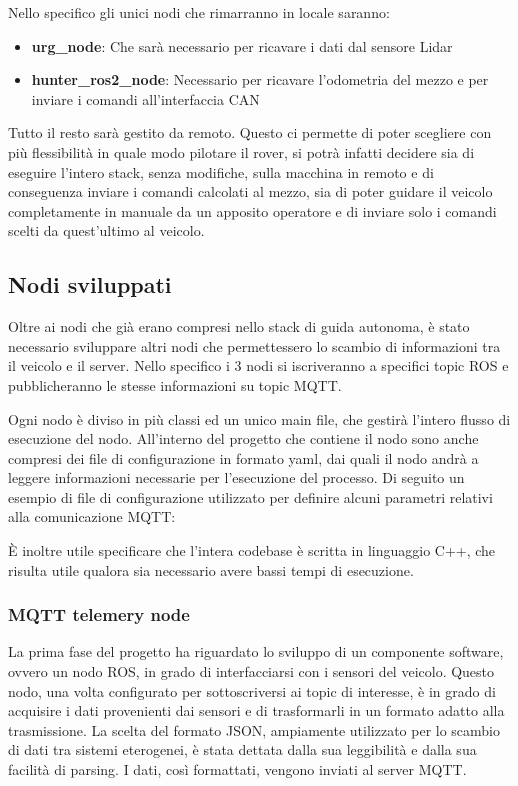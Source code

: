 \noindent Nello specifico gli unici nodi che rimarranno in locale saranno:

\begin{itemize}
  \item \textbf{urg\_node}: Che sarà necessario per ricavare i dati dal sensore Lidar
  \item \textbf{hunter\_ros2\_node}: Necessario per ricavare l'odometria del mezzo e per inviare i comandi all'interfaccia CAN
\end{itemize}

\noindent Tutto il resto sarà gestito da remoto. Questo ci permette di poter scegliere con più flessibilità in quale modo pilotare il rover, si potrà infatti decidere sia di eseguire l'intero stack, senza modifiche, sulla macchina in remoto e di conseguenza inviare i comandi calcolati al mezzo, sia di poter guidare il veicolo completamente in manuale da un apposito operatore e di inviare solo i comandi scelti da quest'ultimo al veicolo.

\subsection{Nodi sviluppati}
Oltre ai nodi che già erano compresi nello stack di guida autonoma, è stato necessario sviluppare altri nodi che permettessero lo scambio di informazioni tra il veicolo e il server. Nello specifico i 3 nodi si iscriveranno a specifici topic ROS e pubblicheranno le stesse informazioni su topic MQTT.

\noindent Ogni nodo è diviso in più classi ed un unico main file, che gestirà l'intero flusso di esecuzione del nodo. All'interno del progetto che contiene il nodo sono anche compresi dei file di configurazione in formato yaml, dai quali il nodo andrà a leggere informazioni necessarie per l'esecuzione del processo. Di seguito un esempio di file di configurazione utilizzato per definire alcuni parametri relativi alla comunicazione MQTT:



\noindent È inoltre utile specificare che l'intera codebase è scritta in linguaggio C++, che risulta utile qualora sia necessario avere bassi tempi di esecuzione.

\subsubsection{MQTT telemery node}
La prima fase del progetto ha riguardato lo sviluppo di un componente software, ovvero un nodo ROS, in grado di interfacciarsi con i sensori del veicolo. Questo nodo, una volta configurato per sottoscriversi ai topic di interesse, è in grado di acquisire i dati provenienti dai sensori e di trasformarli in un formato adatto alla trasmissione. La scelta del formato JSON, ampiamente utilizzato per lo scambio di dati tra sistemi eterogenei, è stata dettata dalla sua leggibilità e dalla sua facilità di parsing. I dati, così formattati, vengono inviati al server MQTT.


